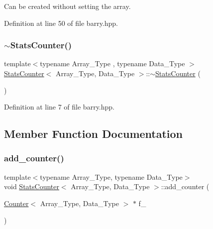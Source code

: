 Can be created without setting the array. 



Definition at line 50 of file barry.\+hpp.

\mbox{\label{classbarry_1_1_stats_counter_a2824d86765d94e909e4b33396250b6c7}} 
\subsubsection{\texorpdfstring{$\sim$\+Stats\+Counter()}{~StatsCounter()}}
{\footnotesize\ttfamily template$<$typename Array\+\_\+\+Type , typename Data\+\_\+\+Type $>$ \\
\hyperlink{classbarry_1_1_stats_counter}{Stats\+Counter}$<$ Array\+\_\+\+Type, Data\+\_\+\+Type $>$\+::$\sim$\hyperlink{classbarry_1_1_stats_counter}{Stats\+Counter} (\begin{DoxyParamCaption}{ }\end{DoxyParamCaption})\hspace{0.3cm}{\ttfamily [inline]}}



Definition at line 7 of file barry.\+hpp.



\subsection{Member Function Documentation}
\mbox{\label{classbarry_1_1_stats_counter_a829e41243a7b18cf71337deeec9f7030}} 
\subsubsection{\texorpdfstring{add\+\_\+counter()}{add\_counter()}\hspace{0.1cm}{\footnotesize\ttfamily [1/2]}}
{\footnotesize\ttfamily template$<$typename Array\+\_\+\+Type, typename Data\+\_\+\+Type$>$ \\
void \hyperlink{classbarry_1_1_stats_counter}{Stats\+Counter}$<$ Array\+\_\+\+Type, Data\+\_\+\+Type $>$\+::add\+\_\+counter (\begin{DoxyParamCaption}\item[{\hyperlink{classbarry_1_1_counter}{Counter}$<$ Array\+\_\+\+Type, Data\+\_\+\+Type $>$ $\ast$}]{f\+\_\+ }\end{DoxyParamCaption})\hspace{0.3cm}{\ttfamily [inline]}}



